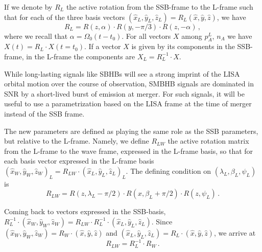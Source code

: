 \documentclass[aps,showpacs,twocolumn,prd,superscriptaddress,nofootinbib]{revtex4-1}
\newcommand{\be}{\begin{equation}}
\newcommand{\ee}{\end{equation}}
\begin{document}
If we denote by $R_{L}$ the active rotation from the SSB-frame to the L-frame such that for each of the three basis vectors $(\hat{x}_{L}, \hat{y}_{L}, \hat{z}_{L}) = R_{L} (\hat{x}, \hat{y}, \hat{z})$, we have
\be\label{eq:RL}
	R_{L} = R(z, \alpha) \cdot R(y, -\pi/3) \cdot R(z, -\alpha) \,,
\ee
where we recall that $\alpha = \Omega_{0} (t-t_{0}) $. For all vectors $X$ among $p_{A}^{L}$, $n_{A}$ we have $X(t) = R_{L} \cdot X(t=t_{0})$. If a vector $X$ is given by its components in the SSB-frame, in the L-frame the components are $X_{L} = R_{L}^{-1} \cdot X$.

While long-lasting signals like SBHBs will see a strong imprint of the LISA orbital motion over the course of observation, SMBHB signals are dominated in SNR by a short-lived burst of emission at merger. For such signals, it will be useful to use a parametrization based on the LISA frame at the time of merger instead of the SSB frame.

The new parameters are defined as playing the same role as the SSB parameters, but relative to the L-frame. Namely, we define $R_{LW}$ the active rotation matrix from the L-frame to the wave frame, expressed in the L-frame basis, so that for each basis vector expressed in the L-frame basis $(\hat{x}_{W}, \hat{y}_{W}, \hat{z}_{W})_{L} = R_{LW} \cdot (\hat{x}_{L}, \hat{y}_{L}, \hat{z}_{L})_{L}$. The defining condition on $(\lambda_{L}, \beta_{L}, \psi_{L})$ is
\be\label{eq:defRLW}
	R_{LW} = R(z, \lambda_{L} - \pi/2) \cdot R(x, \beta_{L} + \pi/2 ) \cdot R(z, \psi_{L}) \,.
\ee

Coming back to vectors expressed in the SSB-basis, $R_{L}^{-1} \cdot (\hat{x}_{W}, \hat{y}_{W}, \hat{z}_{W}) = R_{LW} \cdot R_{L}^{-1} \cdot (\hat{x}_{L}, \hat{y}_{L}, \hat{z}_{L})$. Since $ (\hat{x}_{W}, \hat{y}_{W}, \hat{z}_{W}) = R_{W} \cdot (\hat{x}, \hat{y}, \hat{z})$ and $ (\hat{x}_{L}, \hat{y}_{L}, \hat{z}_{L}) = R_{L} \cdot (\hat{x}, \hat{y}, \hat{z})$, we arrive at
\be\label{eq:RLW}
	R_{LW} = R_{L}^{-1} \cdot R_{W} \,.
\ee
\end{document}

